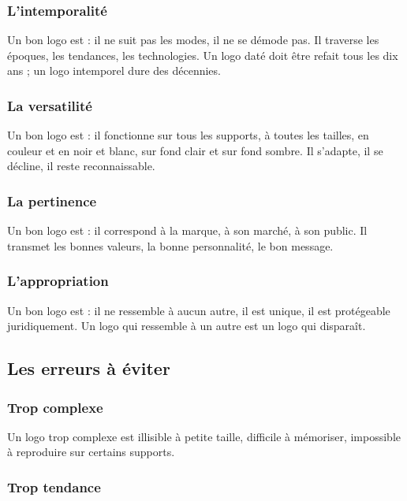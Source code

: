 \subsubsection{L'intemporalité}

Un bon logo est  : il ne suit pas les modes, il ne se démode pas. Il traverse les époques, les tendances, les technologies. Un logo daté doit être refait tous les dix ans ; un logo intemporel dure des décennies.

\subsubsection{La versatilité}

Un bon logo est  : il fonctionne sur tous les supports, à toutes les tailles, en couleur et en noir et blanc, sur fond clair et sur fond sombre. Il s'adapte, il se décline, il reste reconnaissable.

\subsubsection{La pertinence}

Un bon logo est  : il correspond à la marque, à son marché, à son public. Il transmet les bonnes valeurs, la bonne personnalité, le bon message.

\subsubsection{L'appropriation}

Un bon logo est  : il ne ressemble à aucun autre, il est unique, il est protégeable juridiquement. Un logo qui ressemble à un autre est un logo qui disparaît.

\subsection{Les erreurs à éviter}

\subsubsection{Trop complexe}

Un logo trop complexe est illisible à petite taille, difficile à mémoriser, impossible à reproduire sur certains supports.

\subsubsection{Trop tendance}

